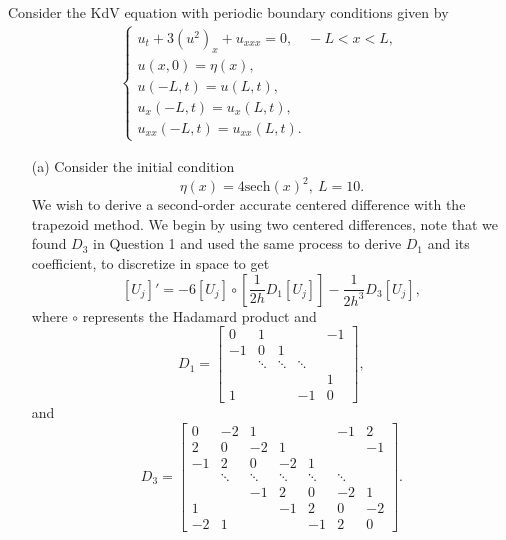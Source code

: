 \documentclass[12pt]{report}
\begin{document}
\begin{solution}

    \noindent
    Consider the KdV equation with periodic boundary conditions given by
    \begin{align*}
        \begin{cases} u_t + 3 (u^2)_x + u_{xxx} = 0, \quad -L < x < L,\\
            u(x,0) = \eta(x),\\
            u(-L,t) = u(L,t),\\
            u_x(-L,t) = u_x(L,t),\\
        u_{xx}(-L,t) = u_{xx}(L,t).\end{cases}
    \end{align*}
    \begin{enumerate}
        \item [(a)]
        Consider the initial condition
        \[
            \eta(x) = 4\mathrm{sech}(x)^2, ~L=10.
        \]
        We wish to derive a second-order accurate centered difference with the trapezoid method. We begin by using two centered differences, note that we found $D_3$ in Question 1 and used the same process to derive $D_1$ and its coefficient, to discretize in space to get
        \[
            [U_j]' = -6[U_j] \circ \left[\frac{1}{2h}D_1 [U_j]\right] - \frac{1}{2h^3}D_3[U_j],
        \]
        where $\circ$ represents the Hadamard product and
        \[
            D_1 = \begin{bmatrix}
                0 & 1  &&&  -1\\
                -1 & 0 & 1\\
                & \ddots & \ddots & \ddots \\
                &&&&1\\
                1 &&& -1 & 0
                \end{bmatrix},
        \]
        and
        \[
            D_3 = \begin{bmatrix}
                0 & -2 & 1 &&& -1 & 2\\
                2 & 0 & -2 & 1 &&& -1 \\
                -1 & 2 & 0 & -2 & 1 \\
                & \ddots & \ddots & \ddots & \ddots & \ddots \\
                && -1 & 2 & 0 & -2 & 1 \\
                1 &&& -1 & 2 & 0 & -2 \\
                -2 & 1 &&& -1 & 2 & 0
                \end{bmatrix}.
\]
\end{enumerate}
\end{solution}
\end{document}
